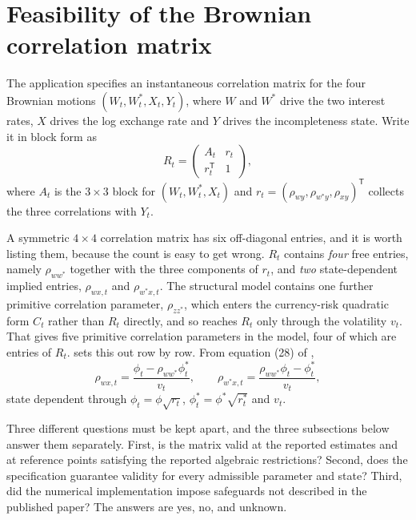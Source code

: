 \documentclass[11pt]{article}
\theoremstyle{definition}
\begin{document}
\FloatBarrier
\section{Feasibility of the Brownian correlation matrix}\label{app:psd}

The application specifies an instantaneous correlation matrix for the four Brownian motions $(W_t,W_t^*,X_t,Y_t)$, where $W$ and $W^*$ drive the two interest rates, $X$ drives the log exchange rate and $Y$ drives the incompleteness state. Write it in block form as
\begin{equation}\label{eq:corr_block}
R_t=
\begin{pmatrix}
A_t&r_t\\
r_t^{\mathsf T}&1
\end{pmatrix},
\end{equation}
where $A_t$ is the $3\times3$ block for $(W_t,W_t^*,X_t)$ and $r_t=(\rho_{wy},\rho_{w^*y},\rho_{xy})^{\mathsf T}$ collects the three correlations with $Y_t$.

A symmetric $4\times4$ correlation matrix has six off-diagonal entries, and it is worth listing them, because the count is easy to get wrong. $R_t$ contains \emph{four} free entries, namely $\rho_{ww^*}$ together with the three components of $r_t$, and \emph{two} state-dependent implied entries, $\rho_{wx,t}$ and $\rho_{w^*x,t}$. The structural model contains one further primitive correlation parameter, $\rho_{zz^*}$, which enters the currency-risk quadratic form $C_t$ rather than $R_t$ directly, and so reaches $R_t$ only through the volatility $v_t$. That gives five primitive correlation parameters in the model, four of which are entries of $R_t$.  sets this out row by row. From equation (28) of \citet{BrandtSantaClara2002},
\begin{equation}\label{eq:implied_corr}
\rho_{wx,t}=\frac{\phi_t-\rho_{ww^*}\phi_t^*}{v_t},
\qquad
\rho_{w^*x,t}=\frac{\rho_{ww^*}\phi_t-\phi_t^*}{v_t},
\end{equation}
state dependent through $\phi_t=\phi\sqrt{r_t}$, $\phi_t^*=\phi^*\sqrt{r_t^*}$ and $v_t$.

Three different questions must be kept apart, and the three subsections below answer them separately. First, is the matrix valid at the reported estimates and at reference points satisfying the reported algebraic restrictions? Second, does the specification guarantee validity for every admissible parameter and state? Third, did the numerical implementation impose safeguards not described in the published paper? The answers are yes, no, and unknown.
\end{document}
